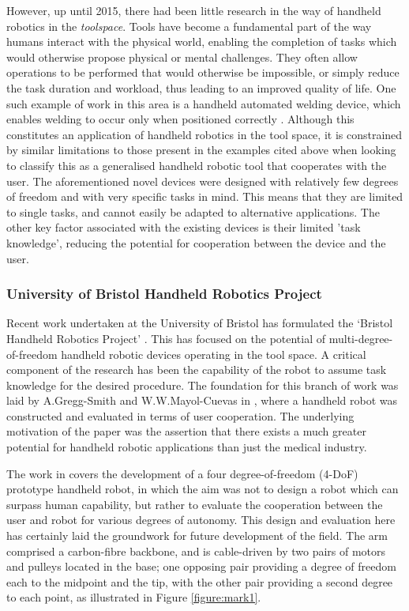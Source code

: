 \documentclass[11pt]{article}
\begin{document}
However, up until 2015, there had been little research in the way of handheld robotics in the \textit{toolspace}. Tools have become a fundamental part of the way humans interact with the physical world, enabling the completion of tasks which would otherwise propose physical or mental challenges. They often allow operations to be performed that would otherwise be impossible, or simply reduce the task duration and workload, thus leading to an improved quality of life. One such example of work in this area is a handheld automated welding device, which enables welding to occur only when positioned correctly \cite{Echtler2004}. Although this constitutes an application of handheld robotics in the tool space, it is constrained by similar limitations to those present in the examples cited above when looking to classify this as a generalised handheld robotic tool that cooperates with the user. The aforementioned novel devices were designed with relatively few degrees of freedom and with very specific tasks in mind. This means that they are limited to single tasks, and cannot easily be adapted to alternative applications. The other key factor associated with the existing devices is their limited 'task knowledge', reducing the potential for cooperation between the device and the user.

\subsubsection{University of Bristol Handheld Robotics Project} \label{bristolhandheld}
Recent work undertaken at the University of Bristol has formulated the `Bristol Handheld Robotics Project' \cite{handheldrobotics}. This has focused on the potential of multi-degree-of-freedom handheld robotic devices operating in the tool space. A critical component of the research has been the capability of the robot to assume task knowledge for the desired procedure. The foundation for this branch of work was laid by A.Gregg-Smith and W.W.Mayol-Cuevas in \cite{GreggSmithDesign}, where a handheld robot was constructed and evaluated in terms of user cooperation. The underlying motivation of the paper was the assertion that there exists a much greater potential for handheld robotic applications than just the medical industry.

The work in \cite{GreggSmithDesign} covers the development of a four degree-of-freedom (4-DoF) prototype handheld robot, in which the aim was not to design a robot which can surpass human capability, but rather to evaluate the cooperation between the user and robot for various degrees of autonomy. This design and evaluation here has certainly laid the groundwork for future development of the field. The arm comprised a carbon-fibre backbone, and is cable-driven by two pairs of motors and pulleys located in the base; one opposing pair providing a degree of freedom each to the midpoint and the tip, with the other pair providing a second degree to each point, as illustrated in Figure \ref{figure:mark1}.
\end{document}
